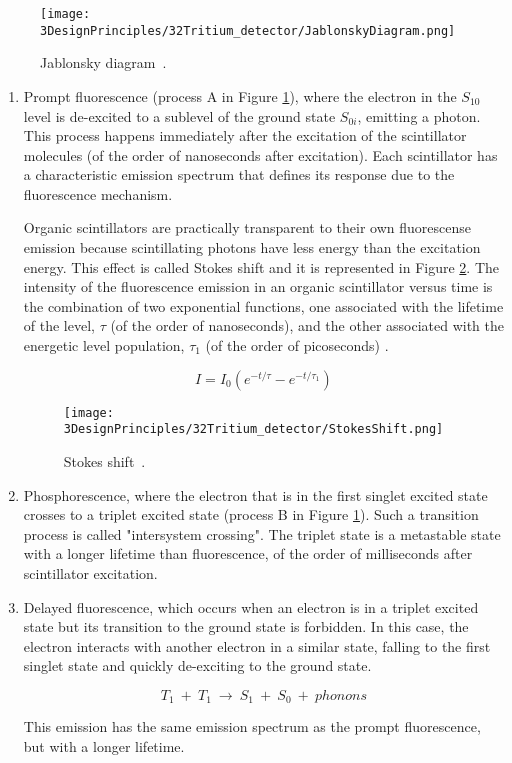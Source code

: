 \begin{figure}[htbp]
\centering
\texttt{[image: 3DesignPrinciples/32Tritium\_detector/JablonskyDiagram.png]}
\caption{Jablonsky diagram\label{fig:JablonskyDiagram}~\cite{Knoll}.}
\end{figure}

\begin{enumerate}

\item{} Prompt fluorescence (process A in Figure \ref{fig:JablonskyDiagram}), where the electron in the $S_{10}$ level  is de-excited to a sublevel of the ground state $S_{0i}$, emitting a photon. This process happens immediately after the excitation of the scintillator molecules (of the order of nanoseconds after excitation). Each scintillator has a characteristic emission spectrum that defines its response due to the fluorescence mechanism. 

Organic scintillators are practically transparent to their own fluorescense emission because scintillating photons have less energy than the excitation energy. This effect is called Stokes shift and it is represented in Figure \ref{fig:StokesShift}. The intensity of the fluorescence emission in an organic scintillator versus time is the combination of two exponential functions, one associated with the lifetime of the level, $\tau$ (of the order of nanoseconds), and the other associated with the energetic level population, $\tau_1$ (of the order of picoseconds) \cite{Knoll}.

\begin{equation}
I=I_0\left(e^{-t/\tau} - e^{-t/\tau_1}\right) 
\label{eq:IntensityTimeScintillator}
\end{equation}

\begin{figure}[htbp]
\centering
\texttt{[image: 3DesignPrinciples/32Tritium\_detector/StokesShift.png]}
\caption{Stokes shift\label{fig:StokesShift}~\cite{Knoll}.}
\end{figure}

\item{} Phosphorescence, where the electron that is in the first singlet excited state crosses to a triplet excited state (process B in Figure \ref{fig:JablonskyDiagram}). Such a transition process is called "intersystem crossing". The triplet state is a metastable state with a longer lifetime than fluorescence, of the order of milliseconds after scintillator excitation.

\item{} Delayed fluorescence, which occurs when an electron is in a triplet excited state but its transition to the ground state is forbidden. In this case, the electron interacts with another electron in a similar state, falling to the first singlet state and quickly de-exciting to the ground state. 

\begin{equation}
T_{1} ~+~ T_{1}~ \longrightarrow ~ S_{1} ~+~ S_{0} ~+~ phonons
\label{eq:DelayFluorescence}
\end{equation}

This emission has the same emission spectrum as the prompt fluorescence, but with a longer lifetime.
\end{enumerate}
